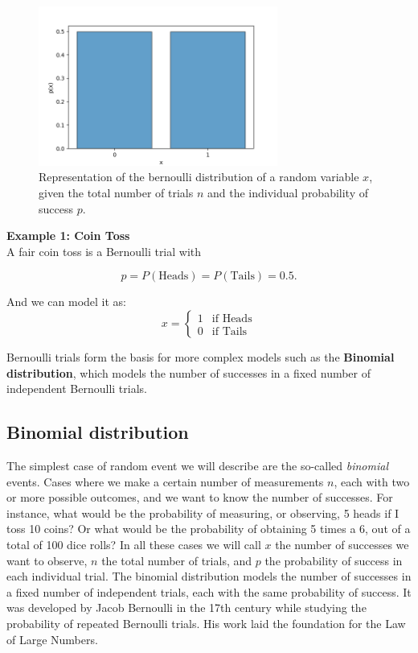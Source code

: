 \documentclass{book}
\begin{document}
\begin{figure}[ht]
    \centering
    \includegraphics[width=0.7\textwidth]{figures/chapter2/bernoulli.png}
    \caption{Representation of the bernoulli distribution of a random variable $x$, given the total number of trials $n$ and the individual probability of success $p$.}
    \label{fig:bernoulli1}
\end{figure}

\textbf{Example 1: Coin Toss}\\

A fair coin toss is a Bernoulli trial with

\begin{equation}
p = P(\text{Heads}) = P(\text{Tails}) = 0.5.
\end{equation}

And we can model it as:
\begin{equation}
x = 
\begin{cases}
1 & \text{if Heads} \\
0 & \text{if Tails}
\end{cases}
\end{equation}

Bernoulli trials form the basis for more complex models such as the \textbf{Binomial distribution}, which models the number of successes in a fixed number of independent Bernoulli trials.

\newpage

\subsection{Binomial distribution}
The simplest case of random event we will describe are the so-called \textit{binomial} events. Cases where we make a certain number of measurements $n$, each with two or more possible outcomes, and we want to know the number of successes. For instance, what would be the probability of measuring, or observing, 5 heads if I toss 10 coins? Or what would be the probability of obtaining 5 times a 6, out of a total of 100 dice rolls? In all these cases we will call $x$ the number of successes we want to observe, $n$ the total number of trials, and $p$ the probability of success in each individual trial. The binomial distribution models the number of successes in a fixed number of independent trials, each with the same probability of success. It was developed by Jacob Bernoulli in the 17th century while studying the probability of repeated Bernoulli trials. His work laid the foundation for the Law of Large Numbers.\\
\end{document}

